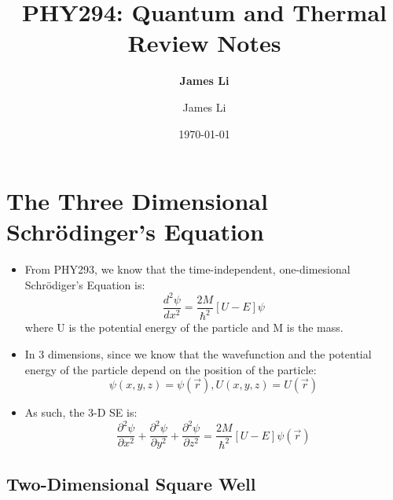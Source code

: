 \documentclass[12pt, letterpaper, twoside]{article}
\author{\textbf{James Li}}
\title{\textbf{PHY294: Quantum and Thermal Review Notes}\vspace{-1.5em}}
\author{James Li\vspace{-2em}}
\date{\today}
\begin{document}
\maketitle
\vspace{-2em}
\section{The Three Dimensional Schr\"{o}dinger's Equation}

\begin{itemize}
    \item From PHY293, we know that the time-independent, one-dimesional Schr\"{o}diger's Equation is:
    \begin{equation}
        \frac{d^2\psi}{dx^2} = \frac{2M}{\hbar^2}[U-E]\psi
    \end{equation}
    where U is the potential energy of the particle and M is the mass.
    \item In 3 dimensions, since we know that the wavefunction and the potential energy of the particle depend on the position of the particle:
    \begin{equation*}
        \psi(x,y,z) = \psi(\vec{r}), U(x,y,z) = U(\vec{r})
    \end{equation*}
    \item As such, the 3-D SE is:
    \begin{equation}
        \frac{\partial^2\psi}{\partial x^2} + \frac{\partial^2\psi}{\partial y^2} + \frac{\partial^2\psi}{\partial z^2} = \frac{2M}{\hbar^2}[U-E]\psi(\vec{r})
    \end{equation}
\end{itemize}

\subsection{Two-Dimensional Square Well}
\end{document}
